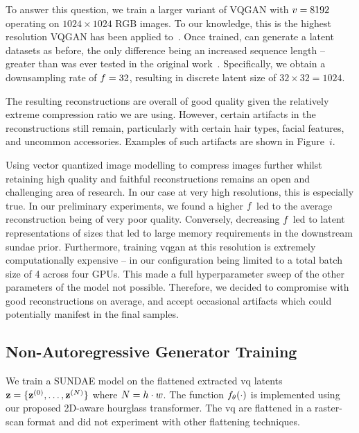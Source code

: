 To answer this question, we train a larger variant of VQGAN with
$v = 8192$ operating on $1024 \times 1024$ RGB images. To our
knowledge, this is the highest resolution VQGAN has been applied
to~\cite{esser2021taming}. Once trained, can generate a latent datasets as
before, the only difference being an increased sequence length -- greater than
was ever tested in the original work~\cite{savinov2022stepunrolled}.
Specifically, we obtain a downsampling rate of $f=32$, resulting
in discrete latent size of $32 \times 32 = 1024$.

The resulting reconstructions are overall of good quality given the relatively
extreme compression ratio we are using. However, certain artifacts in the
reconstructions still remain, particularly with certain hair types, facial
features, and uncommon accessories. Examples of such artifacts are shown in
Figure~$i$.

Using vector quantized image modelling to compress images further whilst
retaining high quality and faithful reconstructions remains an open and
challenging area of research. In our case at very high resolutions, this is
especially true. In our preliminary experiments, we found a higher
$f$ led to the average reconstruction being of very poor quality.
Conversely, decreasing $f$ led to latent representations of sizes
that led to large memory requirements in the downstream \gls{sundae} prior.
Furthermore, training \gls{vqgan} at this resolution is extremely
computationally expensive -- in our configuration being limited to a total batch
size of 4 across four GPUs. This made a full hyperparameter sweep of the other
parameters of the model not possible. Therefore, we decided to compromise with
good reconstructions on average, and accept occasional artifacts which could 
potentially manifest in the final samples.

\subsection{Non-Autoregressive Generator Training}


We train a SUNDAE model on the flattened extracted \gls{vq} latents $\mathbf{z} =
\{\mathbf{z}^{(0)}, \dots, \mathbf{z}^{(N)}\}$ where $N = h \cdot w$.
The function $f_\theta(\cdot)$ is implemented using our proposed 2D-aware
hourglass transformer. The \gls{vq} are flattened in a raster-scan format and
did not experiment with other flattening techniques.

